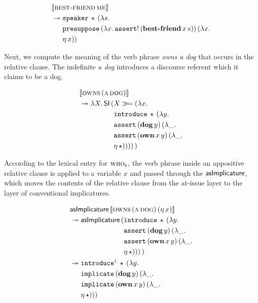 \begin{align*}
  &\llbracket \textsc{best-friend}\,\textsc{me} \rrbracket \\
  &\twoheadrightarrow \begin{aligned}[t]
      &\mathtt{speaker}\,\star\,(\lambda s.\,  \\
      &\mathtt{presuppose}\,(\lambda x.\, \mathtt{assert}!\,(\textbf{best-friend}\,x\,s))\,(\lambda x.\,  \\
      &\eta\,x))
    \end{aligned}
\end{align*}

Next, we compute the meaning of the verb phrase \emph{owns a dog} that
occurs in the relative clause. The indefinite \emph{a dog} introduces a
discourse referent which it claims to be a dog.

\begin{align*}
  &\llbracket \textsc{owns}\,(\textsc{a}\,\textsc{dog}) \rrbracket \\
  &\twoheadrightarrow \lambda X.\, \mathsf{SI}\,(\begin{aligned}[t]
      &X \mathbin{\gg\!=} (\lambda x.\,  \\
      &\mathtt{introduce}\,\star\,(\lambda y.\,  \\
      &\mathtt{assert}\,(\textbf{dog}\,y)\,(\lambda \_.\,  \\
      &\mathtt{assert}\,(\textbf{own}\,x\,y)\,(\lambda \_.\,  \\
      &\eta\,\star))))\,)
    \end{aligned}
\end{align*}

According to the lexical entry for $\textsc{who}_{\textsc{s}}$, the verb phrase
inside an appositive relative clause is applied to a variable $x$ and
passed through the $\mathsf{asImplicature}$, which moves the contents of the
relative clause from the at-issue layer to the layer of conventional
implicatures.

\begin{align*}
  &\mathsf{asImplicature}\,\llbracket \textsc{owns}\,(\textsc{a}\,\textsc{dog})\,(\eta\,x) \rrbracket \\
  &\twoheadrightarrow \mathsf{asImplicature}\,(\begin{aligned}[t]
      &\mathtt{introduce}\,\star\,(\lambda y.\,  \\
      &\mathtt{assert}\,(\textbf{dog}\,y)\,(\lambda \_.\,  \\
      &\mathtt{assert}\,(\textbf{own}\,x\,y)\,(\lambda \_.\,  \\
      &\eta\,\star)))\,)
    \end{aligned} \\
  &\twoheadrightarrow \begin{aligned}[t]
      &\mathtt{introduce^i}\,\star\,(\lambda y.\,  \\
      &\mathtt{implicate}\,(\textbf{dog}\,y)\,(\lambda \_.\,  \\
      &\mathtt{implicate}\,(\textbf{own}\,x\,y)\,(\lambda \_.\,  \\
      &\eta\,\star)))
    \end{aligned}
\end{align*}

